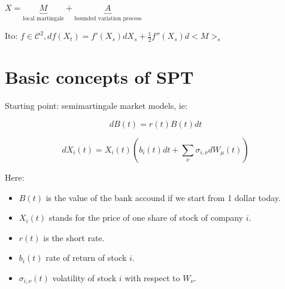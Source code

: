 \documentclass{article} \usepackage[utf8]{inputenc}
\begin{document}
$X = \underbrace{M}_{\text{local martingale}} + \underbrace{A}_{\text{bounded variation process}}$

Ito: $f \in \mathcal C^2, df(X_t) = f'(X_s)dX_s + \frac12 f''(X_s)d<M>_s$
\section{Basic concepts of SPT}
Starting point: semimartingale market models, ie:

\begin{equation}
  dB(t) = r(t) B(t) dt
\end{equation}

\begin{equation}
dX_i(t) = X_i(t) \left(b_i(t)dt + \sum_{\nu} \sigma_{i,\nu} dW_{\mu}(t)\right)
\end{equation}



Here:
\begin{itemize}
\item $B(t)$ is the value of the bank accound if we start from 1 dollar today.
\item $X_i(t)$ stands for the price of one share of stock of company $i$.
\item $r(t)$ is the short rate.
\item $b_i(t)$ rate of return of stock $i$.
\item $\sigma_{i, \nu}(t)$ volatility of stock $i$ with respect to $W_{\nu}$.

\end{itemize}
\end{document}
